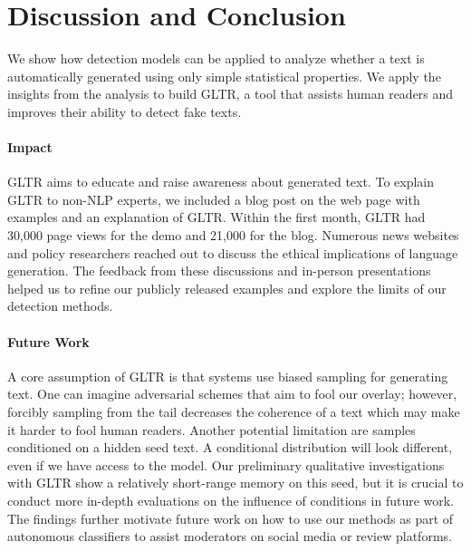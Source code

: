 \documentclass[11pt,a4paper]{article}
\begin{document}
\section{Discussion and Conclusion}

We show how detection models can be applied to analyze whether a text is automatically generated using only simple statistical properties. We apply the insights from the analysis to build GLTR, a tool that assists human readers and improves their ability to detect fake texts.

\paragraph{Impact} GLTR aims to educate and raise awareness about generated text. To explain GLTR to non-NLP experts, we included a blog post on the web page with examples and an explanation of GLTR. Within the first month, GLTR had 30,000 page views for the demo and 21,000 for the blog. Numerous news websites and policy researchers reached out to discuss the ethical implications of language generation. The feedback from these discussions and in-person presentations helped us to refine our publicly released examples and explore the limits of our detection methods.

\paragraph{Future Work}
A core assumption of GLTR is that systems use biased sampling for generating text. One can imagine adversarial schemes that aim to fool our overlay; however, forcibly sampling from the tail decreases the coherence of a text which may make it harder to fool human readers. Another potential limitation are samples conditioned on a hidden seed text. A conditional distribution will look different, even if we have access to the model. Our preliminary qualitative investigations with GLTR show a relatively short-range memory on this seed, but it is crucial to conduct more in-depth evaluations on the influence of conditions in future work. The findings further motivate future work on how to use our methods as part of autonomous classifiers to assist moderators on social media or review platforms.

\end{document}
